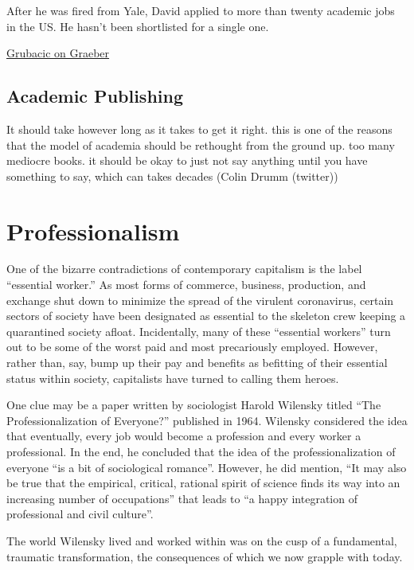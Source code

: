 \documentclass[
]{book}
\begin{document}
After he was fired from Yale, David applied to more than twenty academic jobs in the US. He hasn't been shortlisted for a single one.

\href{https://truthout.org/articles/david-graeber-left-us-a-parting-gift-his-thoughts-on-kropotkins-mutual-aid/}{Grubacic on Graeber}

\hypertarget{academic-publishing}{%
\section{Academic Publishing}\label{academic-publishing}}

It should take however long as it takes to get it right. this is one of the reasons that the model of academia should be rethought from the ground up. too many mediocre books. it should be okay to just not say anything until you have something to say, which can takes decades
(Colin Drumm (twitter))

\hypertarget{professionalism}{%
\chapter{Professionalism}\label{professionalism}}

One of the bizarre contradictions of contemporary
capitalism is the label ``essential worker.''
As most forms of commerce, business,
production, and exchange shut down to minimize the spread
of the virulent coronavirus, certain sectors of society have
been designated as essential to the skeleton crew keeping a
quarantined society afloat. Incidentally, many of these
``essential workers'' turn out to be some of the worst paid and
most precariously employed.
However, rather than, say,
bump up their pay and benefits as befitting of their essential
status within society, capitalists have turned to calling them
heroes.

One clue may be a paper written by sociologist Harold
Wilensky titled ``The Professionalization of Everyone?''
published in 1964. Wilensky considered the idea that
eventually, every job would become a profession and every
worker a professional. In the end, he concluded that the idea
of the professionalization of everyone ``is a bit of sociological
romance''. However, he did mention, ``It may also be
true that the empirical, critical, rational spirit of science finds
its way into an increasing number of occupations'' that leads
to ``a happy integration of professional and civil culture''.

The world Wilensky lived and worked within
was on the cusp of a fundamental, traumatic transformation,
the consequences of which we now grapple with today.
\end{document}

